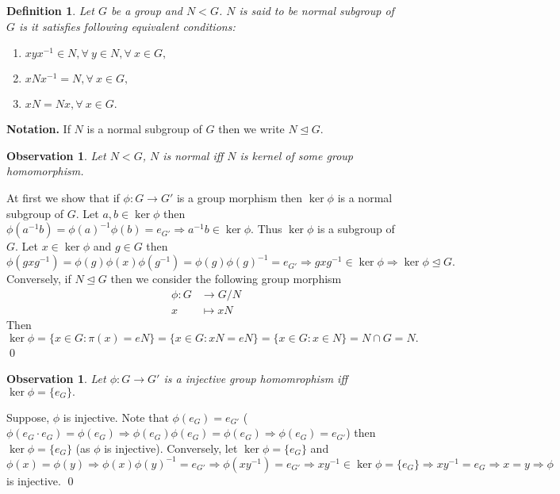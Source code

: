 \documentclass[11pt]{amsart}
\newtheorem{defn}[theorem]{Definition}
\newtheorem{obs}[theorem]{Observation}
\begin{document}
\begin{defn}
Let $G$ be a group and $N<G$. $N$ is said to be normal subgroup of $G$ is it satisfies following equivalent conditions:\begin{enumerate}
\item $xyx^{-1}\in N,\forall~y\in N,\forall~x\in G,$
\item $xNx^{-1}=N,\forall~x\in G,$
\item $xN=Nx,\forall~x\in G.$
\end{enumerate}
\end{defn}
\textbf{Notation.} If $N$ is a normal subgroup of $G$ then we write $N\unlhd G.$
\begin{obs}
Let $N<G$, $N$ is normal iff $N$ is kernel of some group homomorphism.
\end{obs}
\proof At first we show that if $\phi:G\to G'$ is a group morphism then $\ker\phi$ is a normal subgroup of $G.$ Let $a,b\in \ker\phi$ then $\phi(a^{-1}b)=\phi(a)^{-1}\phi(b)=e_{G'} \Rightarrow a^{-1}b\in\ker\phi.$ Thus $\ker\phi$ is a subgroup of $G.$ Let $x\in \ker\phi$ and $g\in G$ then $\phi(gxg^{-1})=\phi(g)\phi(x)\phi(g^{-1})=\phi(g)\phi(g)^{-1}=e_{G'} \Rightarrow gxg^{-1} \in \ker\phi \Rightarrow \ker\phi \unlhd G.$ Conversely, if $N\unlhd G$ then we consider the following group morphism \begin{align*}
\phi:G&\to G/N\\
x&\mapsto xN
\end{align*}
Then $\ker\phi=\{x\in G:\pi(x)=eN\}=\{x\in G: xN=eN\}=\{x\in G:x\in N\}=N\cap G=N.$ \qed
\begin{obs}
Let $\phi:G\to G'$ is a injective group homomrophism iff $\ker\phi=\{e_G\}.$
\end{obs}
\proof Suppose, $\phi$ is injective. Note that $\phi(e_G)=e_{G'}$ ($\phi(e_G\cdot e_G)=\phi(e_G) \Rightarrow \phi(e_G)\phi(e_G)=\phi(e_G) \Rightarrow \phi(e_G)=e_{G'}$) then $\ker\phi=\{e_G\}$ (as $\phi$ is injective). Conversely, let $\ker\phi=\{e_G\}$ and $\phi(x)=\phi(y) \Rightarrow \phi(x)\phi(y)^{-1}=e_{G'} \Rightarrow \phi(xy^{-1})=e_{G'} \Rightarrow xy^{-1}\in \ker\phi=\{e_G\} \Rightarrow xy^{-1}=e_G \Rightarrow x=y \Rightarrow \phi$ is injective. \qed
\end{document}
